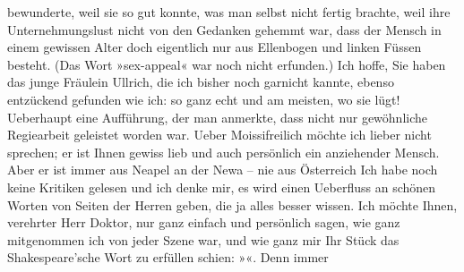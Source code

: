 \begin{ledgroupsized}[t]{13cm}
               bewunderte, weil sie so gut konnte, was man selbst nicht fertig brachte, weil ihre
               Unternehmungslust nicht von den Gedanken gehemmt war, dass der Mensch in einem
               gewissen Alter doch eigentlich nur aus Ellenbogen und linken Füssen besteht. (Das
               Wort »sex-appeal« war noch nicht erfunden.) Ich hoffe, Sie haben das junge Fräulein
                  Ullrich, die ich bisher noch garnicht kannte,
               ebenso entzückend gefunden wie ich: so ganz echt und am meisten, wo sie lügt!\pend
           \pstart
           Ueberhaupt eine Aufführung, der man anmerkte, dass nicht nur gewöhnliche Regiearbeit
               geleistet worden war. Ueber Moissifreilich möchte ich lieber nicht
               sprechen; er ist Ihnen gewiss lieb und auch persönlich ein anziehender Mensch. Aber
               er ist immer aus Neapel an der Newa – nie aus Österreich\pend
           \pstart
           Ich habe noch keine Kritiken gelesen und ich denke mir, es wird einen Ueberfluss an
               schönen Worten von Seiten der Herren geben, die ja alles besser wissen. Ich möchte
               Ihnen, verehrter Herr Doktor, nur ganz einfach und persönlich sagen, wie ganz
               mitgenommen ich von jeder Szene war, und wie ganz mir Ihr Stück das Shakespeare’sche Wort zu erfüllen schien: »\label{K_L02567-2v}\label{K_L02567-2h}«. Denn immer

\end{ledgroupsized}
